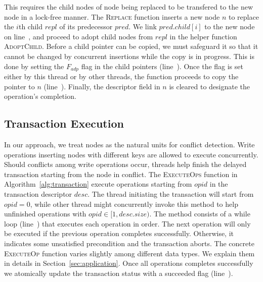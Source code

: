\documentclass[10pt,conference,compsocconf]{IEEEtran}
\begin{document}
This requires the child nodes of node being replaced to be transfered to the new node in a lock-free manner.
The \textsc{Replace} function inserts a new node $n$ to replace the $i$th child $repl$ of its predecessor $pred$.
We link $pred.child[i]$ to the new node on line~, and proceed to adopt child nodes from $repl$ in the helper function \textsc{AdoptChild}.
Before a child pointer can be copied, we must safeguard it so that it cannot be changed by concurrent insertions while the copy is in progress.
This is done by setting the $F_{adp}$ flag in the child pointers (line~).
Once the flag is set either by this thread or by other threads, the function proceeds to copy the pointer to $n$ (line~). 
Finally, the descriptor field in $n$ is cleared to designate the operation's completion.

\subsection{Transaction Execution}
\label{sec:txnexec}
In our approach, we treat nodes as the natural units for conflict detection.
Write operations inserting nodes with different keys are allowed to execute concurrently.
Should conflicts among write operations occur, threads help finish the delayed transaction starting from the node in conflict.
The \textsc{ExecuteOps} function in Algorithm~\ref{alg:transaction} execute operations starting from $opid$ in the transaction descriptor $desc$.
The thread initiating the transaction will start from $opid=0$, while other thread might concurrently invoke this method to help unfinished operations with $opid\in[1,desc.size)$.
The method consists of a while loop (line~) that executes each operation in order.
The next operation will only be executed if the previous operation completes successfully.
Otherwise, it indicates some unsatisfied precondition and the transaction aborts. 
The concrete \textsc{ExecuteOp} function varies slightly among different data types.
We explain them in details in Section~\ref{sec:application}.
Once all operations completes successfully we atomically update the transaction status with a succeeded flag (line~).
\end{document}
